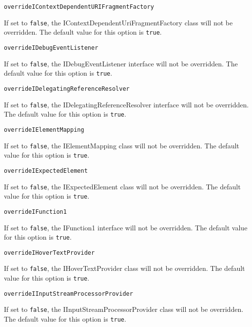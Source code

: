 \noindent\texttt{overrideIContextDependentURIFragmentFactory}
\begin{myindentpar}{1cm}
If set to \texttt{false}, the IContextDependentUriFragmentFactory class will not be overridden. The default value for this option is \texttt{true}.
\end{myindentpar}

\noindent\texttt{overrideIDebugEventListener}
\begin{myindentpar}{1cm}
If set to \texttt{false}, the IDebugEventListener interface will not be overridden. The default value for this option is \texttt{true}.
\end{myindentpar}

\noindent\texttt{overrideIDelegatingReferenceResolver}
\begin{myindentpar}{1cm}
If set to \texttt{false}, the IDelegatingReferenceResolver interface will not be overridden. The default value for this option is \texttt{true}.
\end{myindentpar}

\noindent\texttt{overrideIElementMapping}
\begin{myindentpar}{1cm}
If set to \texttt{false}, the IElementMapping class will not be overridden. The default value for this option is \texttt{true}.
\end{myindentpar}

\noindent\texttt{overrideIExpectedElement}
\begin{myindentpar}{1cm}
If set to \texttt{false}, the IExpectedElement class will not be overridden. The default value for this option is \texttt{true}.
\end{myindentpar}

\noindent\texttt{overrideIFunction1}
\begin{myindentpar}{1cm}
If set to \texttt{false}, the IFunction1 interface will not be overridden. The default value for this option is \texttt{true}.
\end{myindentpar}

\noindent\texttt{overrideIHoverTextProvider}
\begin{myindentpar}{1cm}
If set to \texttt{false}, the IHoverTextProvider class will not be overridden. The default value for this option is \texttt{true}.
\end{myindentpar}

\noindent\texttt{overrideIInputStreamProcessorProvider}
\begin{myindentpar}{1cm}
If set to \texttt{false}, the IInputStreamProcessorProvider class will not be overridden. The default value for this option is \texttt{true}.
\end{myindentpar}


